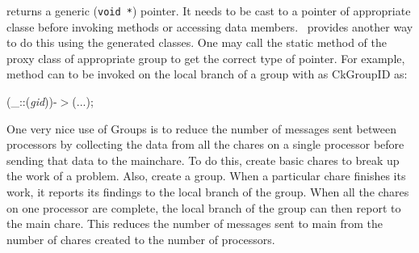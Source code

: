  returns a generic ({\tt void
*}) pointer.  It needs to be
cast to a pointer of appropriate classe before invoking methods or
accessing data members. \charmpp\ provides another way to do this using
the generated
 classes. One may call the static method
 of the proxy class of appropriate
group to get the correct type of pointer.  For
example, method  can to be invoked on the local branch of
a group  with  as CkGroupID as:

(\_::({\it gid}))-$>$(...);\\

One very nice use of Groups is to reduce the number of messages sent between processors by collecting the data from all the chares on a single processor before sending that data to the mainchare.  To do this, create basic chares to break up the work of a problem.  Also, create a group.  When a particular chare finishes its work, it reports its findings to the local branch of the group.  When all the chares on one processor are complete, the local branch of the group can then report to the main chare.  This reduces the number of messages sent to main from the number of chares created to the number of processors.     






